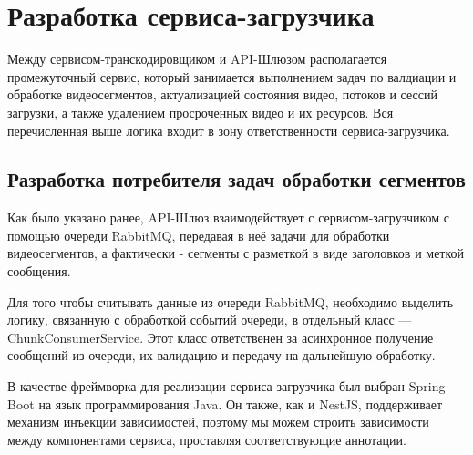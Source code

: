 	\section{Разработка сервиса-загрузчика}
	
	Между сервисом-транскодировщиком и API-Шлюзом располагается промежуточный сервис, который занимается выполнением задач по валдиации и обработке видеосегментов, актуализацией состояния видео, потоков и сессий загрузки, а также удалением просроченных видео и их ресурсов. Вся перечисленная выше логика входит в зону ответственности сервиса-загрузчика.

	\subsection{Разработка потребителя задач обработки сегментов}
	
	Как было указано ранее, API-Шлюз взаимодействует с сервисом-загрузчиком с помощью очереди RabbitMQ, передавая в неё задачи для обработки видеосегментов, а фактически - сегменты с разметкой в виде заголовков и меткой сообщения.

	Для того чтобы считывать данные из очереди RabbitMQ, необходимо выделить логику, связанную с обработкой событий очереди, в отдельный класс — ChunkConsumerService. Этот класс ответственен за асинхронное получение сообщений из очереди, их валидацию и передачу на дальнейшую обработку.

	В качестве фреймворка для реализации сервиса загрузчика был выбран Spring Boot на язык программирования Java. Он также, как и NestJS, поддерживает механизм инъекции зависимостей, поэтому мы можем строить зависимости между компонентами сервиса, проставляя соответствующие аннотации.


